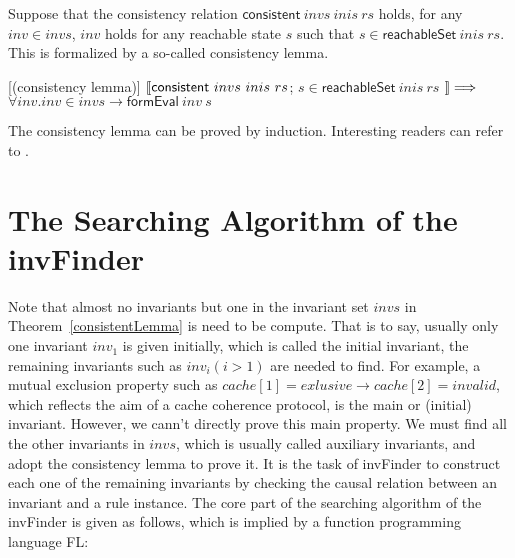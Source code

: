 \documentclass{llncs}
\newcommand\JP[1]{\textcolor{magenta}{JP: #1}}
\begin{document}
Suppose that the consistency relation $\mathsf{consistent}~ invs
~inis~ rs$ holds, for any $inv \in invs$, $inv$ holds for any
reachable state $s$ such that $s  \in \mathsf{reachableSet}~ inis~
rs$. This is formalized by a so-called consistency lemma.
%
\begin{theorem}\label{consistentLemma}[(consistency lemma)]
  $\emph{$\mathopen{\lbrack\mkern-3mu\lbrack}$} \mathsf{consistent}~ invs ~inis~ rs$; $s  \in \mathsf{reachableSet}~ inis~ rs$
  $\emph{$\mathclose{\rbrack\mkern-3mu\rbrack}$}\Longrightarrow$ $\forall inv. inv \in invs \longrightarrow
\mathsf{formEval}~ inv ~s$
\end{theorem}

The consistency lemma can be proved by induction. Interesting
readers can refer to \cite{LiCache13}. %


\section{The Searching Algorithm of the {\sf invFinder}}
Note that almost no invariants but one in the invariant set $invs$
in Theorem~\ref{consistentLemma}
is need to be compute.
That is to say, usually only one invariant $inv_1$ is given
initially, which is called the initial invariant, the remaining invariants such as $inv_i(i>1)$ are needed
to find. For example, a mutual exclusion property such as
 $cache[1]=exlusive \longrightarrow cache[2]=invalid$, which reflects the aim of a cache coherence protocol,
 is the main or (initial) invariant. However, we cann't directly prove this main property. We must find all the other
 invariants in $invs$, which is usually called auxiliary invariants, and adopt the consistency lemma to prove it.
 It is the task of {\sf invFinder} to construct each one of the remaining
invariants by checking the causal relation between an invariant and
a rule instance. The core part of the searching algorithm of the
{\sf invFinder} is given as follows, which is implied by a function
programming language FL:
\end{document}
